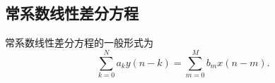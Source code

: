 \subsection{常系数线性差分方程}
常系数线性差分方程的一般形式为
\begin{equation}
    \sum_{k=0}^{N}a_ky(n-k)=\sum_{m=0}^{M}b_mx(n-m).
\end{equation}
